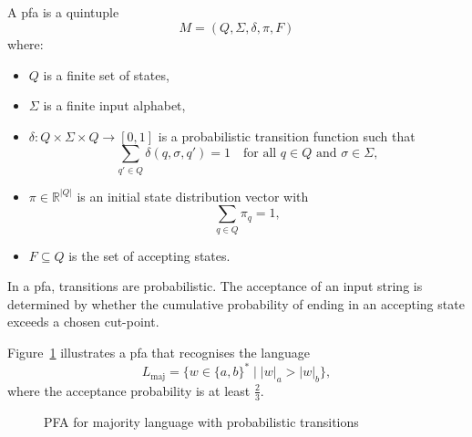 \subsection{}
\label{subsec:pfa}

\begin{definition}
    A \gls{pfa} is a quintuple 
    \[
    M = (Q, \Sigma, \delta, \pi, F)
    \]
    where:
    \begin{itemize}
        \item \( Q \) is a finite set of states,
        \item \( \Sigma \) is a finite input alphabet,
        \item \( \delta: Q \times \Sigma \times Q \rightarrow [0,1] \) is a probabilistic transition function \cite{rabin1963probabilistic} such that 
        \[
        \sum_{q' \in Q} \delta(q, \sigma, q') = 1 \quad \text{for all } q \in Q \text{ and } \sigma \in \Sigma
        ,\]
        \item \( \pi \in \mathbb{R}^{|Q|} \) is an initial state distribution vector with 
        \[
        \sum_{q \in Q} \pi_q = 1,
        \]
        \item \( F \subseteq Q \) is the set of accepting states.
    \end{itemize}
\end{definition}

\begin{remark}
In a \gls{pfa}, transitions are probabilistic. The acceptance of an input string is determined by whether the cumulative probability of ending in an accepting state exceeds a chosen cut-point.
\end{remark}

\begin{example}
Figure~\ref{fig:pfa-example} illustrates a \gls{pfa} that recognises the language 
\[
L_{\text{maj}} = \{ w \in \{a,b\}^* \mid |w|_a > |w|_b \},
\]
where the acceptance probability is at least \( \frac{2}{3} \).
\end{example}

\begin{figure}[ht]
    \centering  
    \caption{PFA for majority language with probabilistic transitions}
    \label{fig:pfa-example}
\end{figure}

